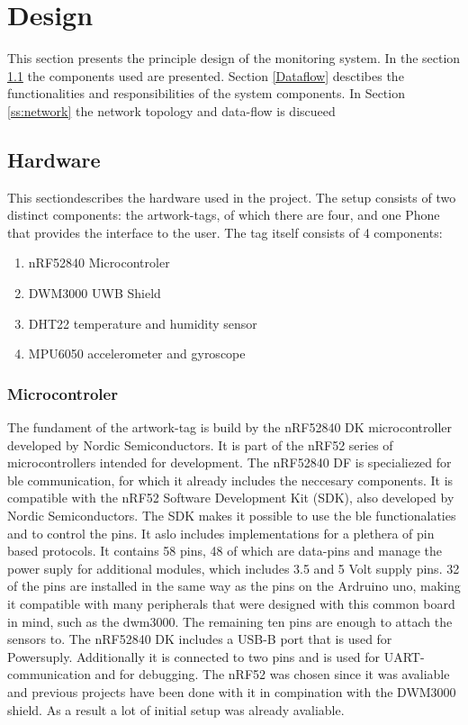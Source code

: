 \chapter{Design}

This section presents the principle design of the monitoring system.
In the section \ref{ss:hardware} the components used are presented.
Section \ref{Dataflow} desctibes the functionalities and responsibilities of the system components.
In Section \ref{ss:network} the network topology and data-flow is discueed

\section{Hardware}
\label{ss:hardware}

This sectiondescribes the hardware used in the project. The setup consists of two distinct components: the artwork-tags, of which there are four, and one Phone that provides the interface to the user. The tag itself consists of 4 components:
\begin{enumerate}
	\item nRF52840 Microcontroler
	\item DWM3000 UWB Shield
	\item DHT22 temperature and humidity sensor
	\item MPU6050 accelerometer and gyroscope
\end{enumerate}

\subsection{Microcontroler}
The fundament of the artwork-tag is build by the nRF52840 DK microcontroller developed by Nordic Semiconductors. 
It is part of the nRF52 series of microcontrollers intended for development.
The nRF52840 DF is specialiezed for ble communication, for which it already includes the neccesary components.
It is compatible with the nRF52 Software Development Kit (SDK), also developed by Nordic Semiconductors.
The SDK makes it possible to use the ble functionalaties and to control the pins. It aslo includes implementations for a plethera of pin based protocols.
It contains 58 pins, 48 of which are data-pins and manage the power suply for additional modules, which includes 3.5 and 5 Volt supply pins.
32 of the pins are installed in the same way as the pins on the Ardruino uno, making it compatible with many peripherals that were designed with this common board in mind, such as the dwm3000.
The remaining ten pins are enough to attach the sensors to.
The nRF52840 DK includes a USB-B port that is used for Powersuply. Additionally it is connected to two pins and is used for UART-communication and for debugging.
The nRF52 was chosen since it was avaliable and previous projects have been done with it in compination with the DWM3000 shield.
As a result a lot of initial setup was already avaliable.

